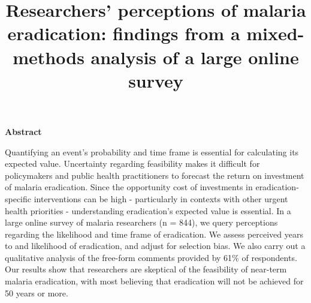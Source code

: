 \documentclass[]{article}
\title{Researchers' perceptions of malaria eradication: findings from a
mixed-methods analysis of a large online survey}
\author{}
\date{}
\begin{document}
\maketitle

\begin{center}
\textbf{Abstract}  
\end{center}

\vspace{5mm}

\begin{center}
\begin{changemargin}{3cm}{3cm} 

Quantifying an event's probability and time frame is essential for calculating its expected value. Uncertainty regarding feasibility makes it difficult for policymakers and public health practitioners to forecast the return on investment of malaria eradication. Since the opportunity cost of investments in eradication-specific interventions can be high - particularly in contexts with other urgent health priorities - understanding eradication's expected value is essential. In a large online survey of malaria researchers (n = 844), we query perceptions regarding the likelihood and time frame of eradication. We assess perceived years to and likelihood of eradication, and adjust for selection bias. We also carry out a qualitative analysis of the free-form comments provided by 61\% of respondents. Our results show that researchers are skeptical of the feasibility of near-term malaria eradication, with most believing that eradication will not be achieved for 50 years or more.
\end{changemargin}
\end{center}

\vspace{10mm}

\noindent{}
\end{document}

